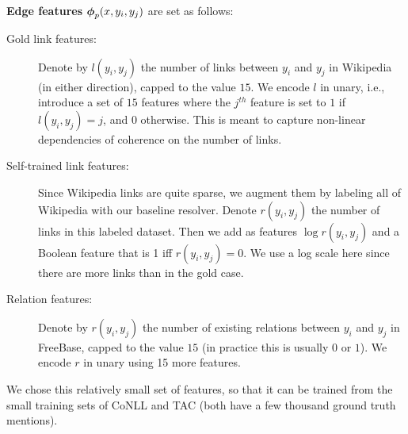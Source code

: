 \noindent
\textbf{Edge features} $\boldsymbol{\phi}_p(x,y_i,y_j)$ are set as follows:
\begin{description}
\item[Gold link features:] Denote by $l(y_i,y_j)$ the number of links between $y_i$ and $y_j$ in Wikipedia (in either direction), capped to the value $15$.  We encode $l$ in unary, i.e., introduce a set of $15$ features where the $j^{th}$ feature is set to $1$ if $l(y_i,y_j) = j$, and $0$ otherwise. This is meant to capture non-linear dependencies of coherence on the number of links.
\item[Self-trained link features:] Since Wikipedia links are quite sparse, we augment them by labeling all of Wikipedia with our baseline resolver.  Denote $r(y_i,y_j)$ the number of links in this labeled dataset. Then we add as features $\log{r(y_i,y_j)}$  and a Boolean feature that is 1 iff $r(y_i,y_j)=0$.  We use a log scale here since there are more links than in the gold case. 
\item[Relation features:] Denote by $r(y_i,y_j)$ the number of existing relations between $y_i$ and $y_j$ in FreeBase, capped to the value $15$ (in practice this is usually $0$ or $1$).  We encode $r$ in unary using 15 more features.
\end{description}
We chose this relatively small set of features, so that it can be trained from the small training sets of CoNLL and TAC (both have a few thousand ground truth mentions).
